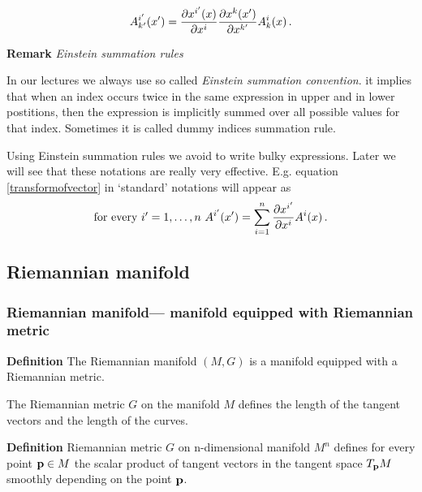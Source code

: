 \documentclass[12pt]{article}
\theoremstyle{theorem}
\numberwithin{equation}{section}
\begin{document}
             $$
    A^{i'}_{k'}(x')=        
{\partial x^{i'}(x)\over \partial x^{i}}{\partial x^k(x')\over \partial x^{k'}}A^i_k(x)\,.
             $$





{\bf Remark} {\it Einstein  summation rules}


 In our lectures we always use so called {\it Einstein summation convention}.
 it  implies that when an index occurs twice
in the same expression in upper and in lower postitions, then
 the expression is implicitly summed over all possible values
for that index.
  Sometimes it is called dummy indices summation rule.
 

   Using Einstein summation rules we avoid to write
bulky expressions. 
Later we will see that these notations are really very effective.
E.g. equation \eqref{transformofvector}
in `standard' notations will appear as
         $$
  \hbox {for every $i'=1,\dots,n$}\,\,
A^{i'}(x')=\sum_{i=1}^n{\partial x^{i'}\over \partial x^i}A^i(x)\,.
         $$ 

\subsection {Riemannian manifold}

    \subsubsection {Riemannian manifold---
manifold equipped with Riemannian metric}

{\bf Definition} The Riemannian manifold $(M,G)$ is a
manifold equipped with a Riemannian metric.



  The Riemannian metric $G$ on the manifold $M$ defines the
  length of the tangent vectors and the length of the curves.

{\bf Definition}
  Riemannian metric $G$ on n-dimensional manifold $M^n$
  defines for every point ${\bf p}\in M$ the scalar product
  of tangent vectors in the tangent space $T_{\bf p} M$
  smoothly depending on the point ${\bf p} $.
\end{document}
